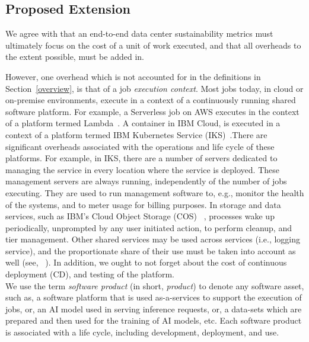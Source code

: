 \subsection{Proposed Extension}
\label{extensions}
We agree with \cite{gandhi2022metrics} that an end-to-end data center sustainability metrics must ultimately focus on the cost of a unit of work executed, and that all overheads to the extent possible, must be added in. 

However, one overhead which is not accounted for in the definitions in Section~\ref{overview}, is that of a job {\em execution context}. Most jobs today, in cloud or on-premise environments, execute in a context of a continuously running shared software platform. For example, a Serverless job on AWS executes in the context of a platform termed Lambda~\cite{lambda}. A container in IBM Cloud, is executed in a context of a platform termed IBM Kubernetes Service (IKS)~\cite{iks}.There are significant overheads associated with the operations and life cycle of these platforms. 
For example, in IKS, there are a number of servers dedicated to managing the service in every location where the service is deployed. These management servers are always running, independently of the number of jobs executing. They are used
to run management software to, e.g.,  
monitor the health of the systems, and to meter usage for billing purposes.
In storage and data services, such as IBM's Cloud Object Storage (COS) ~\cite{cos}, processes wake up periodically, unprompted by any user initiated action, to perform cleanup, and tier management. Other shared services may be used across services (i.e., logging service),
and the proportionate share of their use must be taken into account as well (see, ~\cite{Eilam2021Towards}). 
In addition, we ought to not forget about the cost of continuous deployment (CD), and testing of the platform. 
\\
We use the term {\it software product} (in short, {\it product}) to 
denote any software asset, such as, a software platform that is used as-a-services to support the execution of jobs, or, an AI model used in serving inference requests, or, a data-sets which are prepared and then used for the training of AI models, etc. Each software product is associated with a life cycle, including development, deployment, and use. 

